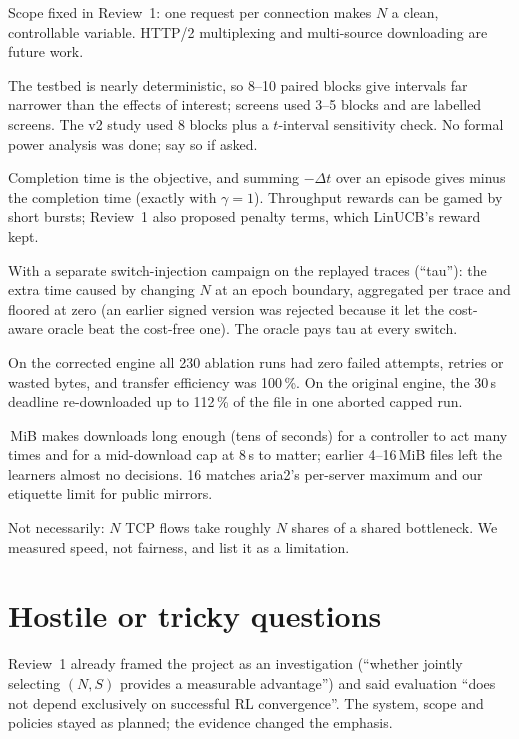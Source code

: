 \A Scope fixed in Review~1: one request per connection makes $N$ a clean, controllable variable. HTTP/2 multiplexing and multi-source downloading are future work.

\A The testbed is nearly deterministic, so 8--10 paired blocks give intervals far narrower than the effects of interest; screens used 3--5 blocks and are labelled screens. The v2 study used 8 blocks plus a $t$-interval sensitivity check. No formal power analysis was done; say so if asked.

\A Completion time is the objective, and summing $-\Delta t$ over an episode gives minus the completion time (exactly with $\gamma=1$). Throughput rewards can be gamed by short bursts; Review~1 also proposed penalty terms, which LinUCB's reward kept.

\A With a separate switch-injection campaign on the replayed traces (``tau''): the extra time caused by changing $N$ at an epoch boundary, aggregated per trace and floored at zero (an earlier signed version was rejected because it let the cost-aware oracle beat the cost-free one). The oracle pays tau at every switch.

\A On the corrected engine all 230 ablation runs had zero failed attempts, retries or wasted bytes, and transfer efficiency was 100\,\%. On the original engine, the 30\,s deadline re-downloaded up to 112\,\% of the file in one aborted capped run.

\,MiB makes downloads long enough (tens of seconds) for a controller to act many times and for a mid-download cap at 8\,s to matter; earlier 4--16\,MiB files left the learners almost no decisions. 16 matches aria2's per-server maximum and our etiquette limit for public mirrors.

\A Not necessarily: $N$ TCP flows take roughly $N$ shares of a shared bottleneck. We measured speed, not fairness, and list it as a limitation.

\section{Hostile or tricky questions}
\A Review~1 already framed the project as an investigation (``whether jointly selecting $(N,S)$ provides a measurable advantage'') and said evaluation ``does not depend exclusively on successful RL convergence''. The system, scope and policies stayed as planned; the evidence changed the emphasis.

